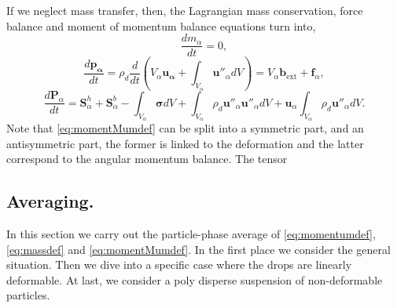 If we neglect mass transfer, 
then, the Lagrangian mass conservation, force balance and moment of momentum balance equations turn into,
\begin{equation}
    \label{eq:massdef}
    \frac{d m_\alpha}{dt} 
    = 0,
\end{equation}
\begin{equation}
    \label{eq:momentumdef}
    \frac{d \bm{p_\alpha}}{dt} 
    = \rho_d \frac{d}{dt} \left(V_\alpha \bm{u_\alpha} 
    + \int_{V_\alpha} \bm{u''}_\alpha dV\right)
    = V_\alpha\bm{b}_{\text{ext}} 
    + \bm{f}_\alpha,
\end{equation}
\begin{equation}
    \label{eq:momentMumdef}
    \frac{d\bm{P}_\alpha}{dt} 
    = \bm{S}_\alpha^{h}
    + \bm{S}_\alpha^{b}
    - \int_{V_\alpha} \bm{\sigma} dV
    + \int_{V_\alpha}\rho_d \bm{u''}_\alpha \bm{u''}_\alpha dV
    + \bm{u}_\alpha \int_{V_\alpha}\rho_d  \bm{u''}_\alpha dV.
\end{equation} 
Note that \ref{eq:momentMumdef} can be split into a symmetric part, and an antisymmetric part, the former is linked to the deformation and the latter correspond to the angular momentum balance.
The tensor 



\subsection{Averaging.}
In this section we carry out the particle-phase average of \ref{eq:momentumdef}, \ref{eq:massdef} and \ref{eq:momentMumdef}.
In the first place we consider the general situation.
Then we dive into a specific case where the drops are linearly deformable.
At last, we consider a poly disperse suspension of non-deformable particles.


